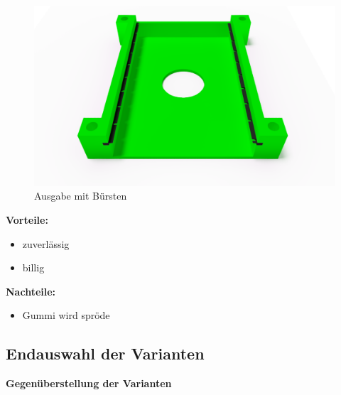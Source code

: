 \begin{figure}[H]
    \centering
    \includegraphics[scale=0.5,page=1]{fig/mech/AusgabeMitGummiabstreifer}
    \caption{Ausgabe mit Bürsten}
\end{figure}

\textbf{Vorteile:}
\begin{itemize}
    \item zuverlässig
    \item billig
\end{itemize}
\textbf{Nachteile:}
\begin{itemize}
    \item Gummi wird spröde
\end{itemize}

\subsection{Endauswahl der Varianten}

\textbf{\large{Gegenüberstellung der Varianten}}

